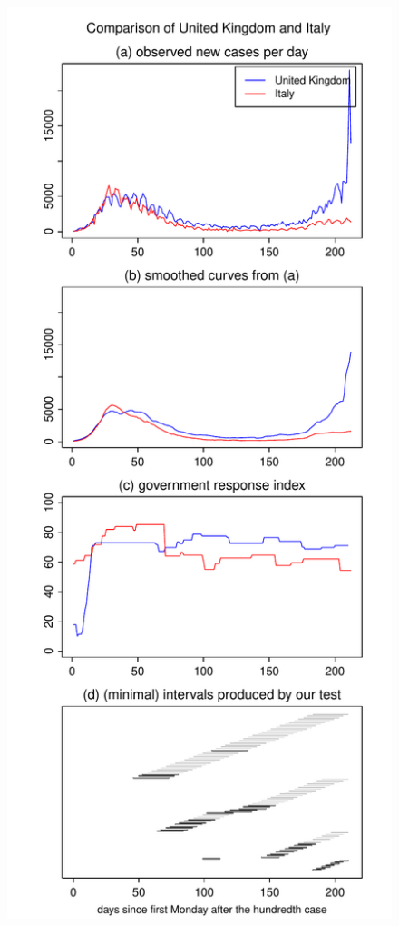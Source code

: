 \documentclass[a4paper,12pt]{article}
\numberwithin{equation}{section}
\begin{document}
\begin{figure}[h!]
\begin{minipage}[t]{0.49\textwidth}
\includegraphics[width=\textwidth]{plots/GBR_vs_ITA_four_countries}

\end{minipage}
\end{figure}
\end{document}
